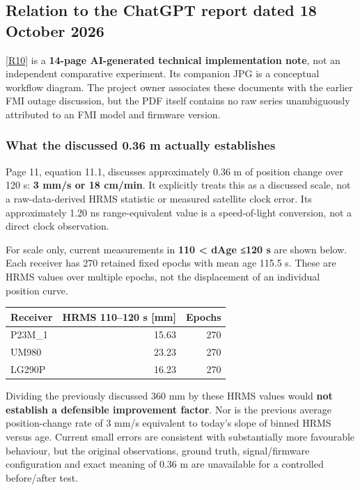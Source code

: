 \documentclass[11pt,a4paper]{article}
\numberwithin{equation}{section}
\numberwithin{figure}{section}
\begin{document}
\subsection{Relation to the ChatGPT report dated 18 October 2026}

\hyperlink{ref-R10}{[R10]} is a \textbf{14-page AI-generated technical implementation note}, not an independent comparative experiment. Its companion JPG is a conceptual workflow diagram. The project owner associates these documents with the earlier FMI outage discussion, but the PDF itself contains no raw series unambiguously attributed to an FMI model and firmware version.

\subsubsection{What the discussed 0.36 m actually establishes}

Page 11, equation 11.1, discusses approximately 0.36 m of position change over 120 s: \textbf{3 mm/\allowbreak{}s or 18 cm/\allowbreak{}min}. It explicitly treats this as a discussed scale, not a raw-data-derived HRMS statistic or measured satellite clock error. Its approximately 1.20 ns range-equivalent value is a speed-of-light conversion, not a direct clock observation.

For scale only, current measurements in \textbf{110 < dAge ≤120 s} are shown below. Each receiver has 270 retained fixed epochs with mean age 115.5 s. These are HRMS values over multiple epochs, not the displacement of an individual position curve.

\begin{center}\begin{lrbox}{\reporttable}\small\setlength{\tabcolsep}{4pt}\begin{tabular}{lrr}\toprule
Receiver & HRMS 110–120 s [mm] & Epochs\\\midrule
P23M\_1 & 15.63 & 270\\
UM980 & 23.23 & 270\\
LG290P & 16.23 & 270\\
\bottomrule\end{tabular}\end{lrbox}\ifdim\wd\reporttable>\linewidth\resizebox{\linewidth}{!}{\usebox{\reporttable}}\else\usebox{\reporttable}\fi\end{center}

Dividing the previously discussed 360 mm by these HRMS values would \textbf{not establish a defensible improvement factor}. Nor is the previous average position-change rate of 3 mm/\allowbreak{}s equivalent to today's slope of binned HRMS versus age. Current small errors are consistent with substantially more favourable behaviour, but the original observations, ground truth, signal/\allowbreak{}firmware configuration and exact meaning of 0.36 m are unavailable for a controlled before/\allowbreak{}after test.
\end{document}
